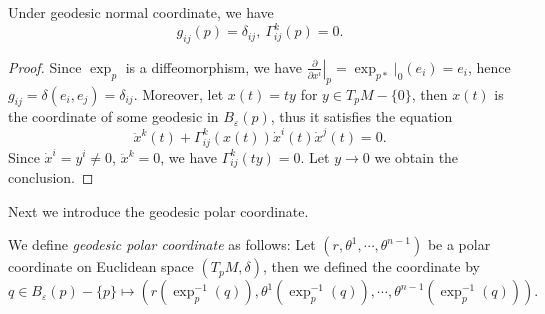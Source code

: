 \begin{prop}
    Under geodesic normal coordinate, we have
    \[g_{ij}(p)=\delta_{ij},\ \Gamma^k_{ij}(p)=0.\]
\end{prop}
\begin{proof}
    Since $\exp_p$ is a diffeomorphism, we have $\left.\frac{\partial{}}{\partial{x^i}}\right|_p=\exp_{p*}|_0(e_i)=e_i$, hence $g_{ij}=\delta(e_i,e_j)=\delta_{ij}$.
    Moreover, let $x(t)=ty$ for $y\in T_pM-\{0\}$, then $x(t)$ is the coordinate of some geodesic in $B_\varepsilon(p)$, thus it satisfies the equation
    \[\ddot{x}^k(t)+\Gamma^k_{ij}(x(t))\dot{x}^i(t)\dot{x}^j(t)=0.\]
    Since $\dot{x}^i=y^i\neq 0$, $\ddot{x}^k=0$, we have $\Gamma^k_{ij}(ty)=0$.
    Let $y\to 0$ we obtain the conclusion.
\end{proof}

Next we introduce the geodesic polar coordinate.
\begin{defn}
    We define \emph{geodesic polar coordinate} as follows:
    Let $(r,\theta^1,\cdots,\theta^{n-1})$ be a polar coordinate on Euclidean space $(T_pM,\delta)$, then we defined the coordinate by
    \[q\in B_\varepsilon(p)-\{p\}\mapsto(r(\exp_p^{-1}(q)),\theta^1(\exp_p^{-1}(q)),\cdots,\theta^{n-1}(\exp_p^{-1}(q))).\]
\end{defn}

